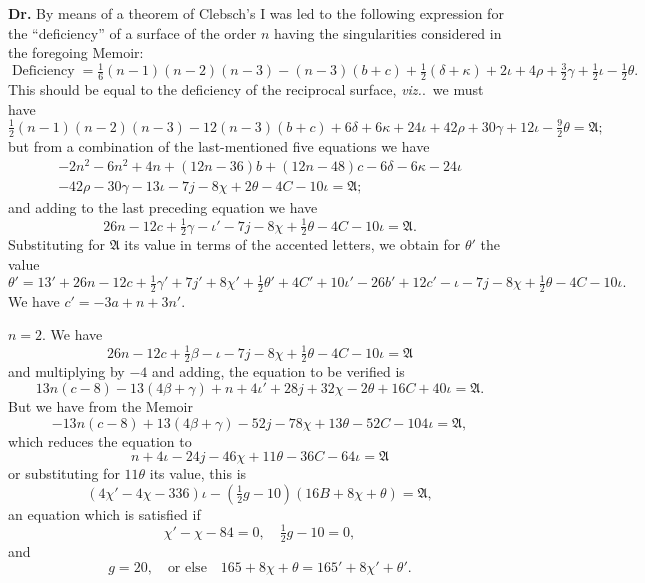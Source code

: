 \documentclass[11pt,a4paper]{article}
\theoremstyle{definition}
\newcommand{\viz}{\textit{viz.}}
\DeclareMathOperator{\Def}{Deficiency}
\begin{document}
\textbf{Dr.} By means of a theorem of Clebsch's I was led to the following expression for the ``deficiency'' of a surface of the order $n$ having the singularities considered in the foregoing Memoir:
\[
\Def = \tfrac{1}{6}(n-1)(n-2)(n-3) - (n-3)(b+c) + \tfrac{1}{2}(\delta + \kappa) + 2\iota + 4\rho + \tfrac{3}{2}\gamma + \tfrac{1}{2}\iota - \tfrac{1}{2}\theta.
\]
This should be equal to the deficiency of the reciprocal surface, \viz.\ we must have
\[
\tfrac{1}{2}(n-1)(n-2)(n-3) - 12(n-3)(b+c) + 6\delta + 6\kappa + 24\iota + 42\rho + 30\gamma + 12\iota - \tfrac{9}{2}\theta = \mathfrak{A};
\]
but from a combination of the last-mentioned five equations we have
\begin{multline*}
-2n^2 - 6n^2 + 4n + (12n - 36)b + (12n - 48)c - 6\delta - 6\kappa - 24\iota \\
- 42\rho - 30\gamma - 13\iota - 7j - 8\chi + 2\theta - 4C - 10\iota = \mathfrak{A};
\end{multline*}
and adding to the last preceding equation we have
\[
26n - 12c + \tfrac{1}{2}\gamma - \iota' - 7j - 8\chi + \tfrac{1}{2}\theta - 4C - 10\iota = \mathfrak{A}.
\]
Substituting for $\mathfrak{A}$ its value in terms of the accented letters, we obtain for $\theta'$ the value
\[
\theta' = 13' + 26n - 12c + \tfrac{1}{2}\gamma' + 7j' + 8\chi' + \tfrac{1}{2}\theta' + 4C' + 10\iota' - 26b' + 12c' - \iota - 7j - 8\chi + \tfrac{1}{2}\theta - 4C - 10\iota.
\]
We have $c' = -3a + n + 3n'$.

\setcounter{page}{358}

$n = 2$. We have
\[
26n - 12c + \tfrac{1}{2}\beta - \iota - 7j - 8\chi + \tfrac{1}{2}\theta - 4C - 10\iota = \mathfrak{A}
\]
and multiplying by $-4$ and adding, the equation to be verified is
\[
13n(c - 8) - 13(4\beta + \gamma) + n + 4\iota' + 28j + 32\chi - 2\theta + 16C + 40\iota = \mathfrak{A}.
\]
But we have from the Memoir
\[
-13n(c - 8) + 13(4\beta + \gamma) - 52j - 78\chi + 13\theta - 52C - 104\iota = \mathfrak{A},
\]
which reduces the equation to
\[
n + 4\iota - 24j - 46\chi + 11\theta - 36C - 64\iota = \mathfrak{A}
\]
or substituting for $11\theta$ its value, this is
\[
(4\chi' - 4\chi - 336)\iota - (\tfrac{1}{2}g - 10)(16B + 8\chi + \theta) = \mathfrak{A},
\]
an equation which is satisfied if
\[
\chi' - \chi - 84 = 0, \quad \tfrac{1}{2}g - 10 = 0,
\]
and
\[
g = 20, \quad \text{or else} \quad 165 + 8\chi + \theta = 165' + 8\chi' + \theta'.
\]

\end{document}
